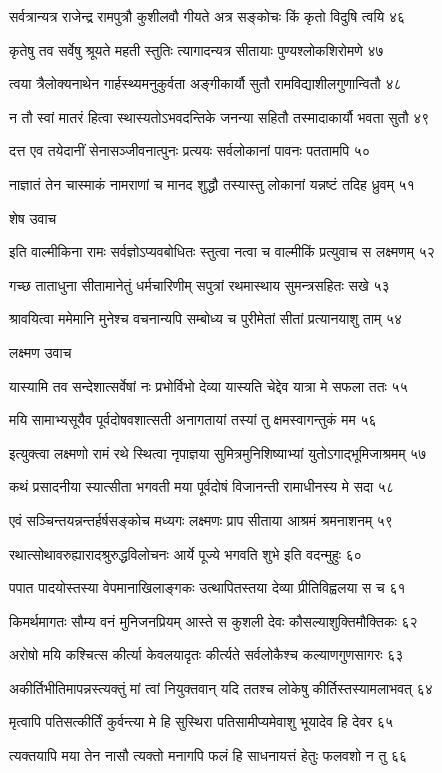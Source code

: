 सर्वत्रान्यत्र राजेन्द्र रामपुत्रौ कुशीलवौ
गीयते अत्र सङ्कोचः किं कृतो विदुषि त्वयि ४६

कृतेषु तव सर्वेषु श्रूयते महती स्तुतिः
त्यागादन्यत्र सीतायाः पुण्यश्लोकशिरोमणे ४७

त्वया त्रैलोक्यनाथेन गार्हस्थ्यमनुकुर्वता
अङ्गीकार्यौ सुतौ रामविद्याशीलगुणान्वितौ ४८

न तौ स्वां मातरं हित्वा स्थास्यतोऽभवदन्तिके
जनन्या सहितौ तस्मादाकार्यौ भवता सुतौ ४९

दत्त एव तयेदानीं सेनासञ्जीवनात्पुनः
प्रत्ययः सर्वलोकानां पावनः पततामपि ५०

नाज्ञातं तेन चास्माकं नामराणां च मानद
शुद्धौ तस्यास्तु लोकानां यन्नष्टं तदिह ध्रुवम् ५१

शेष उवाच

इति वाल्मीकिना रामः सर्वज्ञोऽप्यवबोधितः
स्तुत्वा नत्वा च वाल्मीकिं प्रत्युवाच स लक्ष्मणम् ५२

गच्छ ताताधुना सीतामानेतुं धर्मचारिणीम्
सपुत्रां रथमास्थाय सुमन्त्रसहितः सखे ५३

श्रावयित्वा ममेमानि मुनेश्च वचनान्यपि
सम्बोध्य च पुरीमेतां सीतां प्रत्यानयाशु ताम् ५४

लक्ष्मण उवाच

यास्यामि तव सन्देशात्सर्वेषां नः प्रभोर्विभो
देव्या यास्यति चेद्देव यात्रा मे सफला ततः ५५

मयि सामाभ्यसूयैव पूर्वदोषवशात्सती
अनागतायां तस्यां तु क्षमस्वागन्तुकं मम ५६

इत्युक्त्वा लक्ष्मणो रामं रथे स्थित्वा नृपाज्ञया
सुमित्रमुनिशिष्याभ्यां युतोऽगाद्भूमिजाश्रमम् ५७

कथं प्रसादनीया स्यात्सीता भगवती मया
पूर्वदोषं विजानन्ती रामाधीनस्य मे सदा ५८

एवं सञ्चिन्तयन्नन्तर्हर्षसङ्कोच मध्यगः
लक्ष्मणः प्राप सीताया आश्रमं श्रमनाशनम् ५९

रथात्सोथावरुह्यारादश्रुरुद्धविलोचनः
आर्ये पूज्ये भगवति शुभे इति वदन्मुहुः ६०

पपात पादयोस्तस्या वेपमानाखिलाङ्गकः
उत्थापितस्तया देव्या प्रीतिविह्वलया स च ६१

किमर्थमागतः सौम्य वनं मुनिजनप्रियम्
आस्ते स कुशली देवः कौसल्याशुक्तिमौक्तिकः ६२

अरोषो मयि कश्चित्स कीर्त्या केवलयादृतः
कीर्त्यते सर्वलोकैश्च कल्याणगुणसागरः ६३

अकीर्तिभीतिमापन्नस्त्यक्तुं मां त्वां नियुक्तवान्
यदि ततश्च लोकेषु कीर्तिस्तस्यामलाभवत् ६४

मृत्वापि पतिसत्कीर्तिं कुर्वन्त्या मे हि सुस्थिरा
पतिसामीप्यमेवाशु भूयादेव हि देवर ६५

त्यक्तयापि मया तेन नासौ त्यक्तो मनागपि
फलं हि साधनायत्तं हेतुः फलवशो न तु ६६

